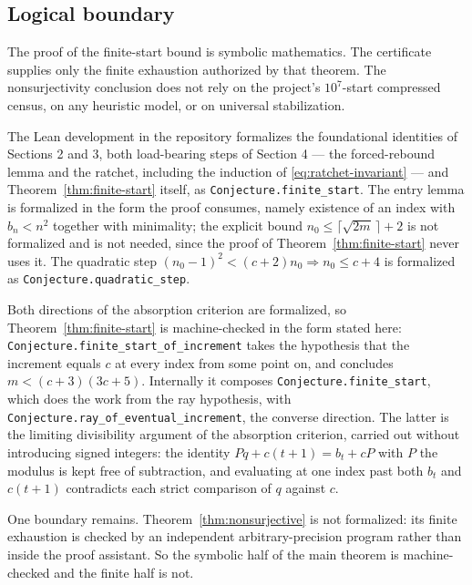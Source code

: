 \subsection*{Logical boundary}
The proof of the finite-start bound is symbolic mathematics. The certificate supplies only the finite exhaustion authorized by that theorem. The nonsurjectivity conclusion does not rely on the project's $10^7$-start compressed census, on any heuristic model, or on universal stabilization.

The Lean development in the repository formalizes the foundational identities of Sections 2 and 3, both load-bearing steps of Section 4 — the forced-rebound lemma and the ratchet, including the induction of \eqref{eq:ratchet-invariant} — and Theorem~\ref{thm:finite-start} itself, as \texttt{Conjecture.finite\_start}. The entry lemma is formalized in the form the proof consumes, namely existence of an index with $b_n<n^2$ together with minimality; the explicit bound $n_0\le\lceil\sqrt{2m}\,\rceil+2$ is not formalized and is not needed, since the proof of Theorem~\ref{thm:finite-start} never uses it. The quadratic step $(n_0-1)^2<(c+2)n_0\Rightarrow n_0\le c+4$ is formalized as \texttt{Conjecture.quadratic\_step}.

Both directions of the absorption criterion are formalized, so Theorem~\ref{thm:finite-start} is machine-checked in the form stated here: \texttt{Conjecture.finite\_start\_of\_increment} takes the hypothesis that the increment equals $c$ at every index from some point on, and concludes $m<(c+3)(3c+5)$. Internally it composes \texttt{Conjecture.finite\_start}, which does the work from the ray hypothesis, with \texttt{Conjecture.ray\_of\_eventual\_increment}, the converse direction. The latter is the limiting divisibility argument of the absorption criterion, carried out without introducing signed integers: the identity $Pq+c(t+1)=b_t+cP$ with $P$ the modulus is kept free of subtraction, and evaluating at one index past both $b_t$ and $c(t+1)$ contradicts each strict comparison of $q$ against $c$.

One boundary remains. Theorem~\ref{thm:nonsurjective} is not formalized: its finite exhaustion is checked by an independent arbitrary-precision program rather than inside the proof assistant. So the symbolic half of the main theorem is machine-checked and the finite half is not.
